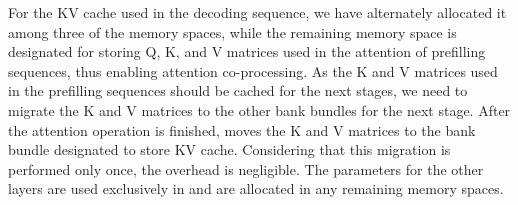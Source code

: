 For the KV cache used in the decoding sequence, we have alternately allocated it among three of the memory spaces, while the remaining memory space is designated for storing Q, K, and V matrices used in the attention of prefilling sequences, thus enabling attention co-processing.
As the K and V matrices used in the prefilling sequences should be cached for the next stages, we need to migrate the K and V matrices to the other bank bundles for the next stage.
After the attention operation is finished, \highp moves the K and V matrices to the bank bundle designated to store KV cache.
Considering that this migration is performed only once, the overhead is negligible.
The parameters for the other layers are used exclusively in \highp and are allocated in any remaining memory spaces.